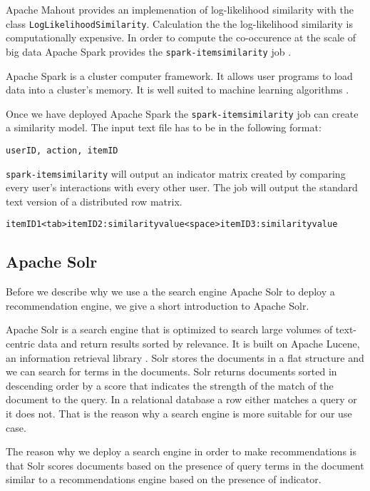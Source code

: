 Apache Mahout provides an implemenation of log-likelihood similarity with the class \verb|LogLikelihoodSimilarity|. Calculation the the log-likelihood similarity is computationally expensive. In order to compute the co-occurence at the scale of big data Apache Spark provides the \verb|spark-itemsimilarity| job \cite{Schelter}. 

Apache Spark is a cluster computer framework. It allows user programs to load data into a cluster's memory. It is well suited to machine learning algorithms \cite{Karau}.

Once we have deployed Apache Spark the \verb|spark-itemsimilarity| job can create a similarity model. The input text file has to be in the following format:
\begin{verbatim}
userID, action, itemID
\end{verbatim}
\verb|spark-itemsimilarity| will output an indicator matrix created by comparing every user's interactions with every other user. The job will output the standard text version of a distributed row matrix.
\begin{verbatim}
itemID1<tab>itemID2:similarityvalue<space>itemID3:similarityvalue
\end{verbatim}

\subsection{Apache Solr}
\label{sec:solr}

Before we describe why we use a the search engine Apache Solr to deploy a recommendation engine, we give a short introduction to Apache Solr.

Apache Solr is a search engine that is optimized to search large volumes of text-centric data and return results sorted by relevance. It is built on Apache Lucene, an information retrieval library \cite{grainger}. Solr stores the documents in a flat structure and we can search for terms in the documents.
Solr returns documents sorted in descending order by a score that indicates the strength of the match of the document to the query. In a relational database a row either matches a query or it does not. That is the reason why a search engine is more suitable for our use case.

The reason why we deploy a search engine in order to make recommendations is that Solr scores documents based on the presence of query terms in the document similar to a recommendations engine based on the presence of indicator.

